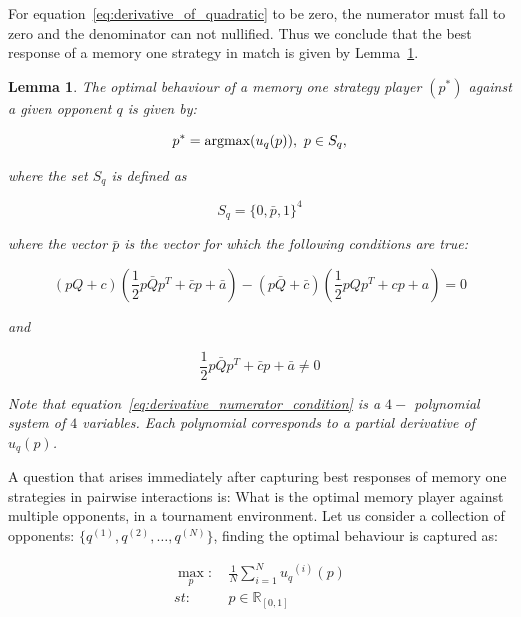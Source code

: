 \documentclass[10pt]{article}
\newcommand{\R}{\mathbb{R}}
\newtheorem{lemma}[theorem]{Lemma}
\begin{document}
For equation~\ref{eq:derivative_of_quadratic} to be zero, the numerator must fall
to zero and the denominator can not nullified. Thus we conclude that the best
response of a memory one strategy in match is given by Lemma~\ref{lemma:memone_best_response}.

\begin{lemma}\label{lemma:memone_best_response}
    The optimal behaviour of a memory one strategy player \((p^*)\) against a
    given opponent \(q\) is given by:
    
    \[p^* = \textnormal{argmax}(u_q(p)), \ p \in S_q,\]
    
    where the set \(S_q\) is defined as 
    
    \[S_q = \{0, \bar{p}, 1 \}^4 \]
    
    where the vector \(\bar{p}\) is the vector for which the following conditions
    are true:
    
    {\small
    \begin{equation}\label{eq:derivative_numerator_condition}
        (pQ + c) ( \frac{1}{2} p  \bar{Q}  p^T + \bar{c}  p + \bar{a}) 
        - (p\bar{Q} + \bar{c})( \frac{1}{2} p  Q  p^T + c p + a) = 0
    \end{equation}}

    and

    {\small
    \begin{equation}
        \frac{1}{2} p  \bar{Q}  p^T + \bar{c}  p + \bar{a} \neq 0
    \end{equation}}

    Note that equation~\ref{eq:derivative_numerator_condition}  is a \(4-\)
    polynomial system of \(4\) variables. Each polynomial corresponds to a partial
    derivative of \(u_q(p)\).
\end{lemma}

A question that arises immediately after capturing best responses of memory one
strategies in pairwise interactions is: What is the optimal memory player against
multiple opponents, in a tournament environment. Let us consider a collection of
opponents: \(\{q^{(1)}, q^{(2)}, \dots, q^{(N)}\}\),  finding the optimal behaviour
is captured as:

\begin{equation}\label{eq:mo_tournament_optimisation}
\begin{aligned}
\max_p: & \ \frac{1}{N} \sum_{i=1} ^ {N} {u_q}^{(i)} (p) 
\\
st: & \ p \in \R_{[0, 1]} 
\end{aligned}
\end{equation}
\end{document}
